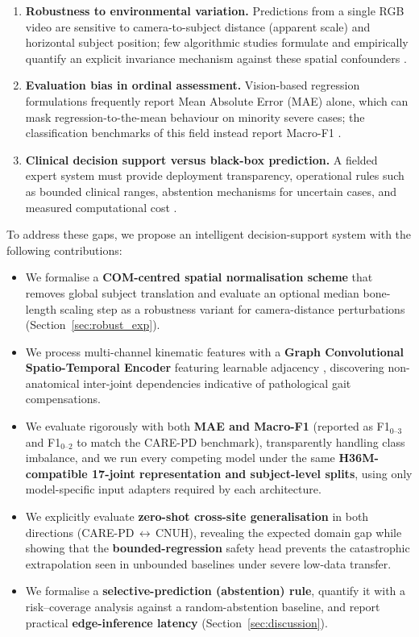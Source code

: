 \documentclass[preprint,12pt]{elsarticle}
\begin{document}
\begin{enumerate}
    \item \textbf{Robustness to environmental variation.} Predictions from a
    single RGB video are sensitive to camera-to-subject distance (apparent
    scale) and horizontal subject position; few algorithmic studies formulate
    and empirically quantify an explicit invariance mechanism against these
    spatial confounders \cite{gennarelli2025skelmamba}.
    \item \textbf{Evaluation bias in ordinal assessment.} Vision-based
    regression formulations frequently report Mean Absolute Error (MAE) alone,
    which can mask regression-to-the-mean behaviour on minority severe cases;
    the classification benchmarks of this field instead report Macro-F1
    \cite{adeli2025carepd}.
    \item \textbf{Clinical decision support versus black-box prediction.}
    A fielded expert system must provide deployment transparency, operational
    rules such as bounded clinical ranges, abstention mechanisms for uncertain
    cases, and measured computational cost \cite{sun2024digital}.
\end{enumerate}

To address these gaps, we propose an intelligent decision-support system with
the following contributions:
\begin{itemize}
    \item We formalise a \textbf{COM-centred spatial normalisation scheme}
    that removes global subject translation and evaluate an optional
    median bone-length scaling step as a robustness variant for camera-distance
    perturbations (Section~\ref{sec:robust_exp}).
    \item We process multi-channel kinematic features with a \textbf{Graph
    Convolutional Spatio-Temporal Encoder} featuring learnable adjacency
    \cite{shi2019twoStream}, discovering non-anatomical inter-joint
    dependencies indicative of pathological gait compensations.
    \item We evaluate rigorously with both \textbf{MAE and Macro-F1}
    (reported as F1$_{0\text{--}3}$ and F1$_{0\text{--}2}$ to match the CARE-PD
    benchmark), transparently handling class imbalance, and we run every
    competing model under the same \textbf{H36M-compatible 17-joint
    representation and subject-level splits}, using only model-specific input
    adapters required by each architecture.
    \item We explicitly evaluate \textbf{zero-shot cross-site generalisation}
    in both directions (CARE-PD\,$\leftrightarrow$\,CNUH), revealing the
    expected domain gap while showing that the \textbf{bounded-regression}
    safety head prevents the catastrophic extrapolation seen in unbounded
    baselines under severe low-data transfer.
    \item We formalise a \textbf{selective-prediction (abstention) rule},
    quantify it with a risk--coverage analysis against a random-abstention
    baseline, and report practical \textbf{edge-inference latency}
    (Section~\ref{sec:discussion}).
\end{itemize}
\end{document}
